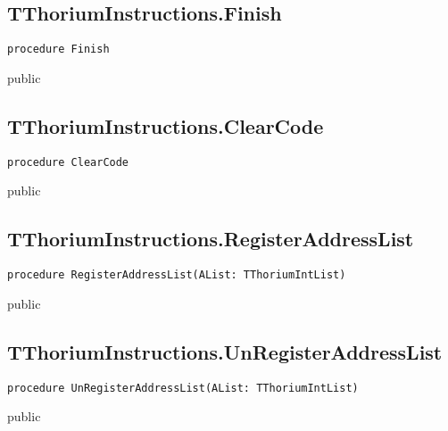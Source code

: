 \subsection{TThoriumInstructions.Finish}
\label{thoriumcorepkg:thorium:tthoriuminstructions:finish}
\begin{FPCList}
\Declaration 

\begin{verbatim}
procedure Finish
\end{verbatim}
\Visibility
public
\end{FPCList}
\subsection{TThoriumInstructions.ClearCode}
\label{thoriumcorepkg:thorium:tthoriuminstructions:clearcode}
\begin{FPCList}
\Declaration 

\begin{verbatim}
procedure ClearCode
\end{verbatim}
\Visibility
public
\end{FPCList}
\subsection{TThoriumInstructions.RegisterAddressList}
\label{thoriumcorepkg:thorium:tthoriuminstructions:registeraddresslist}
\begin{FPCList}
\Declaration 

\begin{verbatim}
procedure RegisterAddressList(AList: TThoriumIntList)
\end{verbatim}
\Visibility
public
\end{FPCList}
\subsection{TThoriumInstructions.UnRegisterAddressList}
\label{thoriumcorepkg:thorium:tthoriuminstructions:unregisteraddresslist}
\begin{FPCList}
\Declaration 

\begin{verbatim}
procedure UnRegisterAddressList(AList: TThoriumIntList)
\end{verbatim}
\Visibility
public
\end{FPCList}
